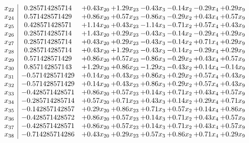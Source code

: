 \documentclass[8pt]{article}
\begin{document}
\[\begin{array}{c| c c@{\hskip 2pt} c@{\hskip 2pt} c@{\hskip 2pt} c@{\hskip 2pt} c@{\hskip 2pt} c@{\hskip 2pt} }
 x_{22}   &  0.285714285714 & +  0.43 x_{20} & +  1.29 x_{23} & -0.43 x_{3} & -0.14 x_{2} & -0.29 x_{4} & +  0.29 x_{9}\\
 x_{24}   &  0.571428571429 & +  0.86 x_{20} & +  0.57 x_{23} & -0.86 x_{3} & -0.29 x_{2} & +  0.43 x_{4} & +  0.57 x_{9}\\
 x_{25}   &  0.428571428571 & +  1.14 x_{20} & +  0.43 x_{23} & -1.14 x_{3} & -0.71 x_{2} & +  0.57 x_{4} & +  0.43 x_{9}\\
 x_{26}   &  0.285714285714 & +  1.43 x_{20} & +  0.29 x_{23} & -0.43 x_{3} & -0.14 x_{2} & -0.29 x_{4} & +  0.29 x_{9}\\
 x_{27}   &  0.285714285714 & +  0.43 x_{20} & +  0.29 x_{23} & -0.43 x_{3} & -0.14 x_{2} & +  0.71 x_{4} & +  0.29 x_{9}\\
 x_{28}   &  0.285714285714 & +  0.43 x_{20} & +  1.29 x_{23} & -0.43 x_{3} & -0.14 x_{2} & -0.29 x_{4} & +  0.29 x_{9}\\
 x_{29}   &  0.571428571429 & +  0.86 x_{20} & +  0.57 x_{23} & -0.86 x_{3} & -0.29 x_{2} & +  0.43 x_{4} & +  0.57 x_{9}\\
 x_{30}   &  0.857142857143 & +  1.29 x_{20} & +  0.86 x_{23} & -1.29 x_{3} & -0.43 x_{2} & +  0.14 x_{4} & -0.14 x_{9}\\
 x_{31}   &  -0.571428571429 & +  0.14 x_{20} & +  0.43 x_{23} & +  0.86 x_{3} & +  0.29 x_{2} & +  0.57 x_{4} & +  0.43 x_{9}\\
 x_{32}   &  -0.571428571429 & +  0.14 x_{20} & +  0.43 x_{23} & +  0.86 x_{3} & +  0.29 x_{2} & +  0.57 x_{4} & +  0.43 x_{9}\\
 x_{33}   &  -0.428571428571 & +  0.86 x_{20} & +  0.57 x_{23} & +  0.14 x_{3} & +  0.71 x_{2} & +  0.43 x_{4} & +  0.57 x_{9}\\
 x_{34}   &  -0.285714285714 & +  0.57 x_{20} & +  0.71 x_{23} & +  0.43 x_{3} & +  0.14 x_{2} & +  0.29 x_{4} & +  0.71 x_{9}\\
 x_{35}   &  -0.142857142857 & +  0.29 x_{20} & +  0.86 x_{23} & +  0.71 x_{3} & +  0.57 x_{2} & +  0.14 x_{4} & +  0.86 x_{9}\\
 x_{36}   &  -0.428571428572 & +  0.86 x_{20} & +  0.57 x_{23} & +  0.14 x_{3} & +  0.71 x_{2} & +  0.43 x_{4} & +  0.57 x_{9}\\
 x_{37}   &  -0.428571428571 & +  0.86 x_{20} & +  0.57 x_{23} & +  0.14 x_{3} & +  0.71 x_{2} & +  0.43 x_{4} & +  0.57 x_{9}\\
 x_{38}   &  -0.714285714286 & +  0.43 x_{20} & +  0.29 x_{23} & +  0.57 x_{3} & +  0.86 x_{2} & +  0.71 x_{4} & +  0.29 x_{9}\\

\end{array}\]
\end{document}
